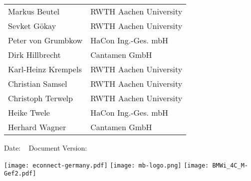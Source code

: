 \begin{titlepage}

\begin{huge}
\bfseries\center
\thistitle

\end{huge}

\vspace{1em}

\begin{large}
\bfseries\noindent
\begin{tabular}{@{}ll@{}}
  Markus Beutel & RWTH Aachen University \\
  Sevket Gökay & RWTH Aachen University \\
  Peter von Grumbkow & HaCon Ing.-Ges. mbH \\
  Dirk Hillbrecht & Cantamen GmbH \\
  Karl-Heinz Krempels & RWTH Aachen University \\
  Christian Samsel & RWTH Aachen University \\
  Christoph Terwelp & RWTH Aachen University \\
  Heike Twele & HaCon Ing.-Ges. mbH \\
  Herhard Wagner & Cantamen GmbH \\
\end{tabular}

\end{large}

\vspace{2em}

Date: \thisdate ~ Document Version: \thisversion

\vspace{1em}

\thisabstract
\vspace{1em}
\vfill

\texttt{[image: econnect-germany.pdf]} \hspace{1.5em}
\texttt{[image: mb-logo.png]}
\hfill \texttt{[image: BMWi\_4C\_M-Gef2.pdf]}


\end{titlepage}
